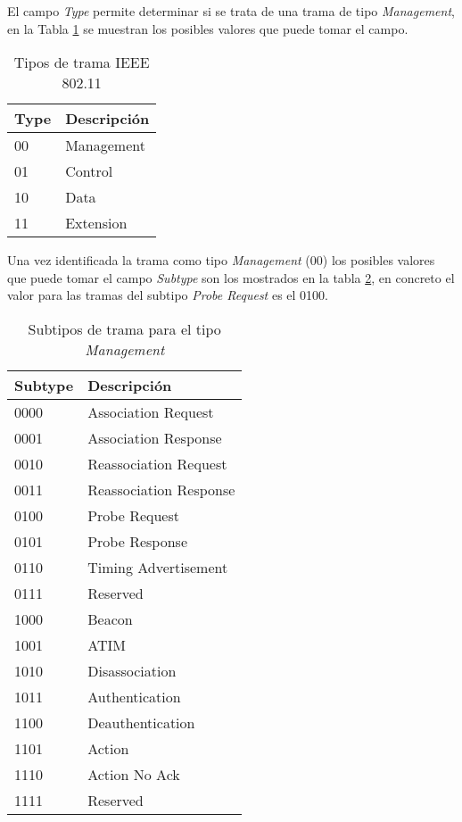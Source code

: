 \documentclass[../proyecto.tex]{subfiles}
\begin{document}
El campo \textit{Type} permite determinar si se trata de una trama de tipo \textit{Management}, en la Tabla \ref{table:tipos_trama} se muestran los posibles valores que puede tomar el campo.\\

\begin{table}[h!]
\centering
\begin{tabular}{ |l|m{20em}| }
\hline
\textbf{Type} & \textbf{Descripción} \\
\hline\hline
00  & Management          \\ \hline
01  & Control  \\ \hline
10  & Data \\ \hline
11 & Extension \\ \hline
\end{tabular}
\caption{Tipos de trama IEEE 802.11}
\label{table:tipos_trama}
\end{table}

Una vez identificada la trama como tipo \textit{Management} (00) los posibles valores que puede tomar el campo \textit{Subtype} son los mostrados en la tabla \ref{table:subtipos_trama}, en concreto el valor para las tramas del subtipo \textit{Probe Request} es el 0100.

\begin{table}[h!]
\centering
\begin{tabular}{ |l|m{20em}| }
\hline
\textbf{Subtype} & \textbf{Descripción} \\
\hline\hline
0000  & Association Request  \\ \hline
0001  & Association Response \\ \hline
0010  & Reassociation Request \\ \hline
0011  & Reassociation Response \\ \hline
0100  & Probe Request \\ \hline
0101  & Probe Response \\ \hline
0110  & Timing Advertisement \\ \hline
0111  & Reserved \\ \hline
1000  & Beacon \\ \hline
1001  & ATIM \\ \hline
1010  & Disassociation \\ \hline
1011  & Authentication \\ \hline
1100  & Deauthentication \\ \hline
1101  & Action \\ \hline
1110  & Action No Ack \\ \hline
1111  & Reserved \\ \hline
\end{tabular}
\caption{Subtipos de trama para el tipo \textit{Management}}
\label{table:subtipos_trama}
\end{table}
\end{document}
